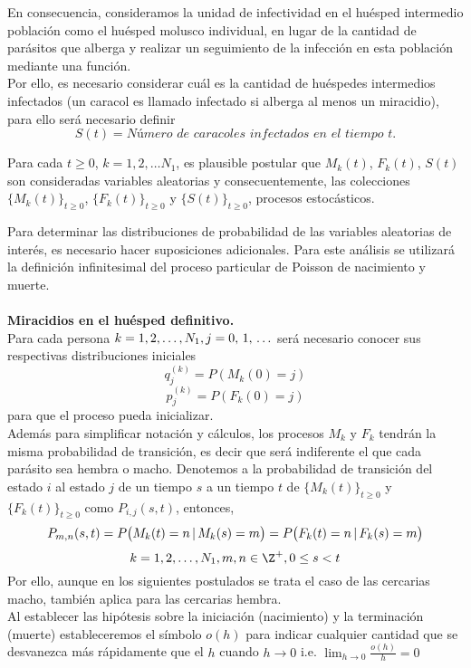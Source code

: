     En consecuencia, consideramos la unidad de infectividad en el huésped intermedio población como el huésped molusco individual, en lugar de la cantidad de parásitos que alberga y realizar un seguimiento de la infección en esta población mediante una función.\\
    Por ello, es necesario considerar cuál es la cantidad de huéspedes intermedios infectados (un caracol es llamado infectado si alberga al menos un miracidio), para ello será necesario definir $$S(t)= \textit{Número de caracoles infectados en el tiempo $t$.}$$
\begin{Obs}
   Para cada $t\geq 0$, $k=1,2,\ldots N_1$, es plausible postular que $M_k(t)$, $F_k(t)$, $S(t)$ son consideradas variables aleatorias y consecuentemente, las colecciones $\{M_k(t)\}_{t\geq 0}$, $\{F_k(t)\}_{t\geq 0}$ y $\{S(t)\}_{t\geq 0}$, procesos estocásticos.
\end{Obs}
Para determinar las distribuciones de probabilidad de las variables aleatorias de interés, es necesario hacer suposiciones adicionales.
Para este análisis se utilizará la definición infinitesimal del proceso particular de Poisson de nacimiento y muerte.\\ \\ 
 \textbf{Miracidios en el huésped definitivo.}\\
Para cada persona $k=1,2,\ldots,N_1, j=0,\thinspace 1,\thinspace\ldots$ será necesario conocer sus respectivas distribuciones iniciales $$q_j^{(k)}=P(M_k(0)=j)$$ $$p_j^{(k)}=P(F_k(0)=j)$$ para que el proceso pueda inicializar.\\
    Además para simplificar notación y cálculos, los procesos $M_k$ y $F_k$ tendrán la misma probabilidad de transición, es decir que será indiferente el que  cada parásito sea hembra o macho.
    Denotemos a la probabilidad de transición del estado $i$ al estado $j$ de un tiempo $s$ a un tiempo $t$ de $\{M_k(t)\}_{t\geq 0}$ y $\{F_k(t)\}_{t\geq 0}$ como $P_{i,j}(s,t)$, entonces, 
    $$P_{m,n}(s,t)=P\big(M_k(t)=n\thinspace|\thinspace M_k(s)=m\big)=P\big(F_k(t)=n\thinspace|\thinspace F_k(s)=m\big)$$
    $$k=1,2,\ldots,N_1, m,n\in\Z^+,0\leq s<t$$
    Por ello, aunque en los siguientes postulados se trata el caso de las cercarias macho, también aplica para las cercarias hembra.\\
    Al establecer las hipótesis sobre la iniciación (nacimiento) y la terminación (muerte)  estableceremos el símbolo $o(h)$ para indicar cualquier cantidad que se desvanezca más rápidamente que el $h$ cuando $h\rightarrow 0$ i.e. $\lim_{h\rightarrow 0}\frac{o(h)}{h}=0$\\
